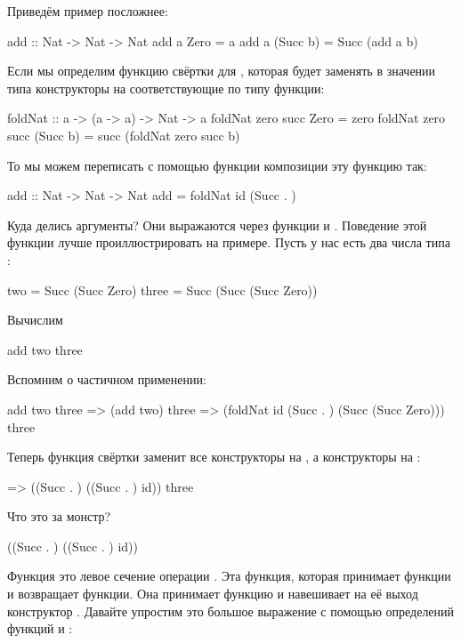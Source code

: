 Приведём пример посложнее:

\begin{code}
add :: Nat -> Nat -> Nat
add  a  Zero     = a
add  a  (Succ b) = Succ (add a b)
\end{code}

Если мы определим функцию свёртки для , которая
будет заменять в значении типа  конструкторы на 
соответствующие по типу функции:

\begin{code}
foldNat :: a -> (a -> a) -> Nat -> a
foldNat zero succ Zero     = zero
foldNat zero succ (Succ b) = succ (foldNat zero succ b)
\end{code}

То мы можем переписать с помощью функции композиции эту функцию так:

\begin{code}
add :: Nat -> Nat -> Nat
add = foldNat  id  (Succ . )
\end{code}

Куда делись аргументы? Они выражаются через функции 
и . Поведение этой функции лучше проиллюстрировать 
на примере. Пусть у нас есть два числа типа :

\begin{code}
two     = Succ (Succ Zero)
three   = Succ (Succ (Succ Zero))
\end{code}

Вычислим 

\begin{code}
add two three
\end{code}

Вспомним о частичном применении:

\begin{code}
    add two three 
=>  (add two) three
=>  (foldNat id (Succ . ) (Succ (Succ Zero))) three
\end{code}

Теперь функция свёртки заменит все конструкторы  
на , а конструкторы  на :

\begin{code}
=>  ((Succ . ) ((Succ . ) id)) three
\end{code}

Что это за монстр?

\begin{code}
((Succ . ) ((Succ . ) id))
\end{code}

Функция  это левое сечение операции . 
Эта функция, которая принимает функции и возвращает функции.
Она принимает функцию и навешивает на её выход конструктор .
Давайте упростим это большое выражение с помощью определений функций
 и :


